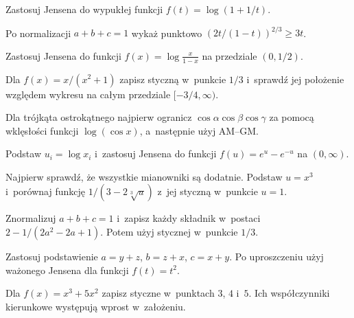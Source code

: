 \documentclass{lecture-kuznia}
\begin{document}
\begin{hint*}[\ref{Z8}]
	Zastosuj Jensena do wypukłej funkcji
	$f(t)=\log(1+1/t)$.
\end{hint*}

\begin{hint*}[\ref{Z9}]
	Po normalizacji $a+b+c=1$ wykaż punktowo
	$\left(2t/(1-t)\right)^{2/3}\geqslant3t$.
\end{hint*}

\begin{hint*}[\ref{ZIloczynyJensen}]
	Zastosuj Jensena do funkcji
	$f(x)=\log\frac{x}{1-x}$ na przedziale $(0,1/2)$.
\end{hint*}

\begin{hint*}[\ref{ZE2}]
	Dla $f(x)=x/(x^2+1)$ zapisz styczną w~punkcie $1/3$ i~sprawdź jej
	położenie względem wykresu na całym przedziale $[-3/4,\infty)$.
\end{hint*}

\begin{hint*}[\ref{ZKatyCosinusy}]
	Dla trójkąta ostrokątnego najpierw ogranicz
	$\cos\alpha\cos\beta\cos\gamma$ za pomocą wklęsłości funkcji
	$\log(\cos x)$, a~następnie użyj AM--GM.
\end{hint*}

\begin{hint*}[\ref{Z11}]
	Podstaw $u_i=\log x_i$ i~zastosuj Jensena do funkcji
	$f(u)=e^u-e^{-u}$ na $(0,\infty)$.
\end{hint*}

\begin{hint*}[\ref{Z10}]
	Najpierw sprawdź, że wszystkie mianowniki są dodatnie. Podstaw $u=x^3$
	i~porównaj funkcję $1/(3-2\sqrt[3]{u})$ z~jej styczną w~punkcie $u=1$.
\end{hint*}

\begin{hint*}[\ref{Z14}]
	Znormalizuj $a+b+c=1$ i~zapisz każdy składnik w~postaci
	$2-1/(2a^2-2a+1)$. Potem użyj stycznej w~punkcie $1/3$.
\end{hint*}

\begin{hint*}[\ref{ZRaviJensen}]
	Zastosuj podstawienie
	$a=y+z$, $b=z+x$, $c=x+y$. Po uproszczeniu użyj ważonego Jensena
	dla funkcji $f(t)=t^2$.
\end{hint*}

\begin{hint*}[\ref{Z12}]
	Dla $f(x)=x^3+5x^2$ zapisz styczne w~punktach $3$, $4$ i~$5$.
	Ich współczynniki kierunkowe występują wprost w~założeniu.
\end{hint*}
\end{document}
